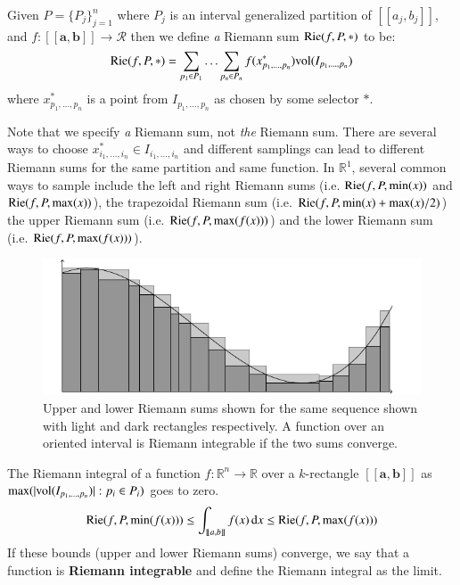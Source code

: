 \begin{definition}
	Given $P=\{ P_j \}_{j=1}^n$ where $P_j$ is an interval generalized partition of $[\![a_j, b_j]\!]$,
	and $f:[\![\boldsymbol{a}, \boldsymbol{b}]\!] \to \mathcal{R}$ then we define \emph{a} Riemann sum 
	$\text{Rie}(f,P,*)$ to be:
	\begin{equation}
		\text{Rie}(f,P,*) = \sum_{p_1 \in P_1} \ldots \sum_{p_n \in P_n} f(x^*_{p_1, \ldots, p_n}) \text{vol}(I_{p_1, \ldots, p_n})
	\end{equation}
	where $x^*_{p_1, \ldots, p_n}$ is a point from $I_{p_1, \ldots, p_n}$ as chosen by some selector $*$.
\end{definition}

Note that we specify \emph{a} Riemann sum, not \emph{the} Riemann sum.
There are several ways to choose $x^*_{i_1,\ldots,i_n} \in I_{i_1, \ldots, i_n}$ and different samplings can lead to different Riemann sums for the same partition and same function.
In $\mathbb{R}^1$, several common ways to sample include 
the left and right Riemann sums (i.e. $\text{Rie}(f,P,\min(x))$ and $\text{Rie}(f,P,\max(x))$), 
the trapezoidal Riemann sum (i.e. $\text{Rie}(f,P, \min(x)+\max(x)/2)$) 
the upper Riemann sum (i.e. $\text{Rie}(f,P, \max(f(x)))$) and 
the lower Riemann sum (i.e. $\text{Rie}(f,P, \max(f(x)))$).


\begin{figure}[ht]
\caption[Riemann Integral]{Upper and lower Riemann sums shown for the same sequence shown with light and dark rectangles respectively. A function over an oriented interval is Riemann integrable if the two sums converge.}
\centering
\includegraphics[scale=0.6]{diagrams/riemann}
\end{figure}


\begin{definition}
The Riemann integral of a function $f:\mathbb{R}^n \to \mathbb{R}$ over a $k$-rectangle 
$[\![\boldsymbol{a}, \boldsymbol{b}]\!]$ as $\max( | \text{vol}( I_{p_1,\ldots, p_n}) | : p_i \in P_i )$ goes to zero.
	\begin{equation}
		\text{Rie}(f,P,\min(f(x))) 
		\leq \int_{[\![a,b]\!]} f(x) \mathop{}\!\mathrm{d} x 
		\leq \text{Rie}(f,P,\max(f(x))) 
	\end{equation} 
	If these bounds (upper and lower Riemann sums) converge, we say that a function is \textbf{Riemann integrable} and
	define the Riemann integral as the limit.
\end{definition}





